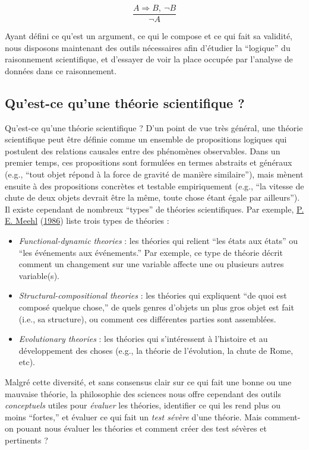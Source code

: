 \documentclass[
  a4paper,11pt,twoside,onecolumn,openright,final,oldfontcommands]{memoir}
\theoremstyle{definition}
\theoremstyle{definition}
\theoremstyle{definition}
\theoremstyle{remark}
\begin{document}
\[\dfrac{A \Rightarrow B, \ \neg B}{\neg A}\]

Ayant défini ce qu'est un argument, ce qui le compose et ce qui fait sa validité, nous disposons maintenant des outils nécessaires afin d'étudier la ``logique'' du raisonnement scientifique, et d'essayer de voir la place occupée par l'analyse de données dans ce raisonnement.

\hypertarget{quest-ce-quune-thuxe9orie-scientifique}{%
\subsection{Qu'est-ce qu'une théorie scientifique ?}\label{quest-ce-quune-thuxe9orie-scientifique}}

Qu'est-ce qu'une théorie scientifique ? D'un point de vue très général, une théorie scientifique peut être définie comme un ensemble de propositions logiques qui postulent des relations causales entre des phénomènes observables. Dans un premier temps, ces propositions sont formulées en termes abstraits et généraux (e.g., ``tout objet répond à la force de gravité de manière similaire''), mais mènent ensuite à des propositions concrètes et testable empiriquement (e.g., ``la vitesse de chute de deux objets devrait être la même, toute chose étant égale par ailleurs''). Il existe cependant de nombreux ``types'' de théories scientifiques. Par exemple, \protect\hyperlink{ref-meehl_what_1986}{P. E. Meehl} (\protect\hyperlink{ref-meehl_what_1986}{1986}) liste trois types de théories :

\begin{itemize}
\item
  \emph{Functional-dynamic theories} : les théories qui relient ``les états aux états'' ou ``les événements aux événements.'' Par exemple, ce type de théorie décrit comment un changement sur une variable affecte une ou plusieurs autres variable(s).
\item
  \emph{Structural-compositional theories} : les théories qui expliquent ``de quoi est composé quelque chose,'' de quels genres d'objets un plus gros objet est fait (i.e., sa structure), ou comment ces différentes parties sont assemblées.
\item
  \emph{Evolutionary theories} : les théories qui s'intéressent à l'histoire et au développement des choses (e.g., la théorie de l'évolution, la chute de Rome, etc).
\end{itemize}

Malgré cette diversité, et sans consensus clair sur ce qui fait une bonne ou une mauvaise théorie, la philosophie des sciences nous offre cependant des outils \emph{conceptuels} utiles pour \emph{évaluer} les théories, identifier ce qui les rend plus ou moins ``fortes,'' et évaluer ce qui fait un \emph{test sévère} d'une théorie. Mais comment-on pouant nous évaluer les théories et comment créer des test sévères et pertinents ?
\end{document}
